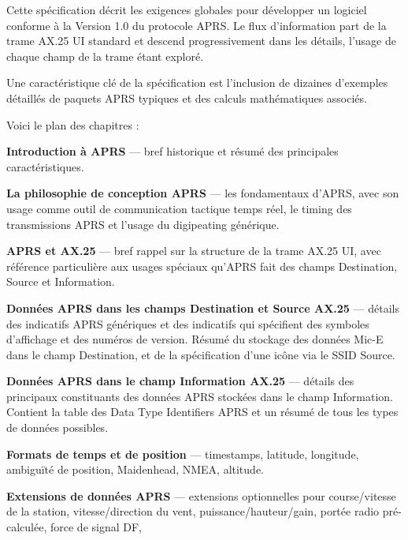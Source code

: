 \begin{aprsbodyblock}
Cette spécification décrit les exigences globales pour développer un
logiciel conforme à la Version 1.0 du protocole APRS. Le flux
d'information part de la trame AX.25 UI standard et descend
progressivement dans les détails, l'usage de chaque champ de la trame
étant exploré.

Une caractéristique clé de la spécification est l'inclusion de dizaines
d'exemples détaillés de paquets APRS typiques et des calculs
mathématiques associés.

Voici le plan des chapitres :

\begin{list}{}{\setlength{\leftmargin}{0pt}\setlength{\rightmargin}{0pt}\setlength{\itemindent}{0pt}\setlength{\labelwidth}{0pt}\setlength{\labelsep}{0pt}\setlength{\itemsep}{0.35em}\setlength{\parsep}{0pt}}
\item
  \textbf{Introduction à APRS} --- bref historique et résumé des
  principales caractéristiques.
\item
  \textbf{La philosophie de conception APRS} --- les fondamentaux
  d'APRS, avec son usage comme outil de communication tactique temps
  réel, le timing des transmissions APRS et l'usage du digipeating
  générique.
\item
  \textbf{APRS et AX.25} --- bref rappel sur la structure de la trame
  AX.25 UI, avec référence particulière aux usages spéciaux qu'APRS fait
  des champs Destination, Source et Information.
\item
  \textbf{Données APRS dans les champs Destination et Source AX.25} ---
  détails des indicatifs APRS génériques et des indicatifs qui
  spécifient des symboles d'affichage et des numéros de version. Résumé
  du stockage des données Mic-E dans le champ Destination, et de la
  spécification d'une icône via le SSID Source.
\item
  \textbf{Données APRS dans le champ Information AX.25} --- détails des
  principaux constituants des données APRS stockées dans le champ
  Information. Contient la table des Data Type Identifiers APRS et un
  résumé de tous les types de données possibles.
\item
  \textbf{Formats de temps et de position} --- timestamps, latitude,
  longitude, ambiguïté de position, Maidenhead, NMEA, altitude.
\item
  \textbf{Extensions de données APRS} --- extensions optionnelles pour
  course/vitesse de la station, vitesse/direction du vent,
  puissance/hauteur/gain, portée radio pré-calculée, force de signal DF,

\end{list}
\end{aprsbodyblock}
